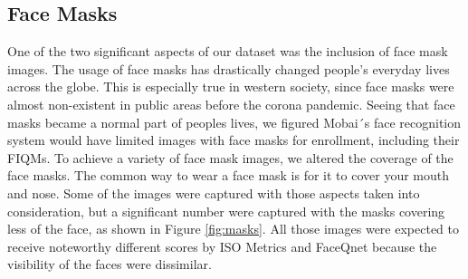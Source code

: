 \subsection*{Face Masks}
One of the two significant aspects of our dataset was the inclusion of face mask images. The usage of face masks has drastically changed people's everyday lives across the globe. This is especially true in western society, since face masks were almost non-existent in public areas before the corona pandemic. Seeing that face masks became a normal part of peoples lives, we figured Mobai´s face recognition system would have limited images with face masks for enrollment, including their FIQMs. 
To achieve a variety of face mask images, we altered the coverage of the face masks. The common way to wear a face mask is for it to cover your mouth and nose. Some of the images were captured with those aspects taken into consideration, but a significant number were captured with the masks covering less of the face, as shown in Figure \ref{fig:masks}. All those images were expected to receive noteworthy different scores by ISO Metrics and FaceQnet because the visibility of the faces were dissimilar.  
